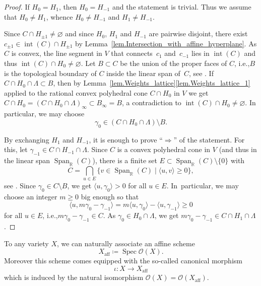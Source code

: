 \documentclass[11pt]{article}
\makeatletter
\newcommand{\ie}{i.e.,\xspace}
\numberwithin{equation}{section}
\let\mathcal\mathscr
\theoremstyle{plain}
\theoremstyle{definition}
\DeclareMathOperator{\Spec}{Spec}
\DeclareMathOperator{\aff}{aff}
\DeclareMathOperator{\Span}{Span}
\DeclareMathOperator{\inter}{int}
\newcommand{\OO}{\mathcal{O}}
\newcommand{\RR}{\mathbb{R}}
\newcommand{\set}[2]{\{#1 \mid #2\}}
\newcommand{\sprod}[2]{\langle #1, #2 \rangle}
\renewcommand\section{\@startsection{section}{1}{\z@}{-3.5ex \@plus -1ex \@minus -.2ex}{2.3ex \@plus .2ex}{\normalfont\large\bfseries}}
\makeatother
\begin{document}
\begin{proof}
If $H_0 = H_1$, then $H_0 = H_{-1}$ and the statement is trivial. Thus we assume that $H_0 \neq H_1$,
whence $H_0 \neq H_{-1}$ and $H_{1} \neq H_{-1}$.

Since $C \cap H_{\pm 1} \neq \varnothing$ and since $H_0$, $H_1$ and $H_{-1}$ are pairwise disjoint,
there exist $c_{\pm 1} \in \inter(C) \cap H_{\pm 1}$ by Lemma~\ref{lem.Intersection_with_affine_hyperplane}. As $C$ is convex, the line segment in
$V$ that connects~$c_1$ and~$c_{-1}$ lies in $\inter(C)$ and thus
$\inter(C) \cap H_0 \neq \varnothing$. Let
$B \subset C$ be the union of the proper faces of $C$, \ie $B$ is the topological
boundary of $C$ inside the linear span of~$C$, see \cite[Propty\,(7), p.\,10]{Fu1993Introduction-to-to}.
If $C \cap H_0 \cap \Lambda \subset B$, then by Lemma~\ref{lem.Weights_lattice}\eqref{lem.Weights_lattice_1} applied to
the rational convex polyhedral cone
$C \cap H_0$ in $V$ we get $C \cap H_0 = (C \cap H_0 \cap \Lambda)_{\infty} \subset B_{\infty} = B$,
a contradiction to $\inter(C) \cap H_0 \neq \varnothing$.
In particular, we may choose
\[
\gamma_0 \in (C \cap H_0 \cap \Lambda) \setminus B.
\]

By exchanging $H_1$ and $H_{-1}$, it is enough to prove
``$\Rightarrow$'' of the statement.
For this, let $\gamma_{-1} \in C \cap H_{-1} \cap \Lambda$.
Since $C$ is a convex polyhedral cone in $V$ (and thus in the linear span $\Span_{\RR}(C)$),
there is a finite set $E \subset \Span_{\RR}(C) \setminus \{0\}$ with
\[
C = \bigcap_{u \in E} \set{v \in \Span_{\RR}(C)}{\sprod{u}{v}\geq 0},
\]
see \cite[Propty\,(8), p. 11]{Fu1993Introduction-to-to}.
Since $\gamma_0 \in C \setminus B$, we get $\sprod{u}{\gamma_0} > 0$ for all $u \in E$. In~particular, we
may choose an integer $m \geq 0$ big enough so that
\[
\sprod{u}{m \gamma_0 - \gamma_{-1}} = m \sprod{u}{\gamma_0} - \sprod{u}{\gamma_{-1}} \geq 0
\]
for all $u \in E$, \ie $m \gamma_0 - \gamma_{-1} \in C$.
As $\gamma_0 \in H_0 \cap \Lambda$, we get
$m \gamma_0 - \gamma_{-1} \in C \cap H_1 \cap \Lambda$.
\end{proof}

\section{Quasi-affine varieties}
\label{sec.Quasi-affine}

To any variety $X$, we can naturally associate an affine scheme
\[
X_{\aff} \coloneqq \Spec \OO(X).
\]
Moreover this scheme comes equipped with the so-called canonical morphism
\[
\iota \colon X \to X_{\aff}
\]
which is induced by the natural isomorphism $\OO(X) = \OO(X_{\aff})$.
\end{document}
